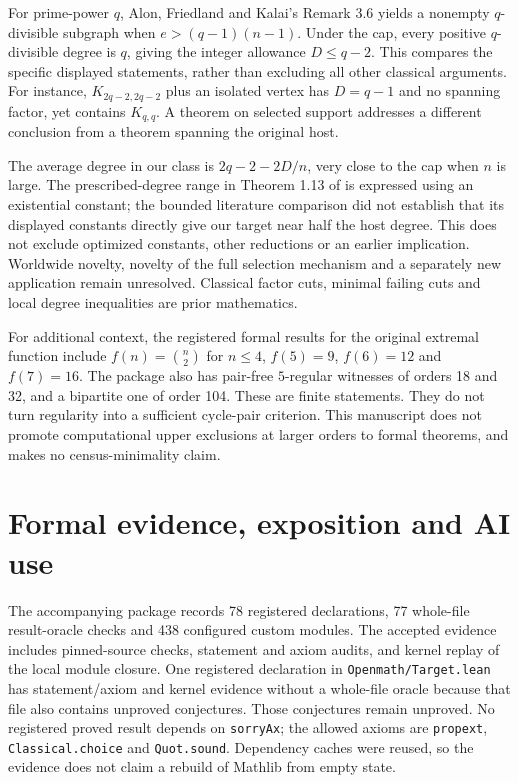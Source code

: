 \documentclass[11pt]{article}
\begin{document}
For prime-power $q$, Alon, Friedland and Kalai's Remark 3.6 \cite{AFK} yields a nonempty $q$-divisible subgraph when $e>(q-1)(n-1)$. Under the cap, every positive $q$-divisible degree is $q$, giving the integer allowance $D\le q-2$. This compares the specific displayed statements, rather than excluding all other classical arguments. For instance, $K_{2q-2,2q-2}$ plus an isolated vertex has $D=q-1$ and no spanning factor, yet contains $K_{q,q}$. A theorem on selected support addresses a different conclusion from a theorem spanning the original host.

The average degree in our class is $2q-2-2D/n$, very close to the cap when $n$ is large. The prescribed-degree range in Theorem 1.13 of \cite{CJMMevery} is expressed using an existential constant; the bounded literature comparison did not establish that its displayed constants directly give our target near half the host degree. This does not exclude optimized constants, other reductions or an earlier implication. Worldwide novelty, novelty of the full selection mechanism and a separately new application remain unresolved. Classical factor cuts, minimal failing cuts and local degree inequalities are prior mathematics.

For additional context, the registered formal results for the original extremal function include $f(n)=\binom n2$ for $n\le4$, $f(5)=9$, $f(6)=12$ and $f(7)=16$. The package also has pair-free $5$-regular witnesses of orders 18 and 32, and a bipartite one of order 104. These are finite statements. They do not turn regularity into a sufficient cycle-pair criterion. This manuscript does not promote computational upper exclusions at larger orders to formal theorems, and makes no census-minimality claim.

\section{Formal evidence, exposition and AI use}
The accompanying package records 78 registered declarations, 77 whole-file result-oracle checks and 438 configured custom modules. The accepted evidence includes pinned-source checks, statement and axiom audits, and kernel replay of the local module closure. One registered declaration in \nolinkurl{Openmath/Target.lean} has statement/axiom and kernel evidence without a whole-file oracle because that file also contains unproved conjectures. Those conjectures remain unproved. No registered proved result depends on \nolinkurl{sorryAx}; the allowed axioms are \nolinkurl{propext}, \nolinkurl{Classical.choice} and \nolinkurl{Quot.sound}. Dependency caches were reused, so the evidence does not claim a rebuild of Mathlib from empty state.
\end{document}
